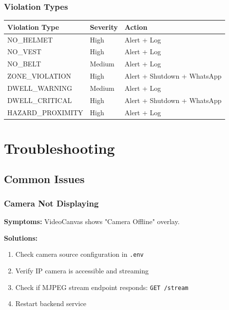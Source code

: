 \documentclass[12pt,a4paper,oneside]{book}
\begin{document}
\subsection{Violation Types}

\begin{tabular}{|l|l|l|}
    \hline
    \textbf{Violation Type} & \textbf{Severity} & \textbf{Action} \\
    \hline
    NO\_HELMET & High & Alert + Log \\
    \hline
    NO\_VEST & High & Alert + Log \\
    \hline
    NO\_BELT & Medium & Alert + Log \\
    \hline
    ZONE\_VIOLATION & High & Alert + Shutdown + WhatsApp \\
    \hline
    DWELL\_WARNING & Medium & Alert + Log \\
    \hline
    DWELL\_CRITICAL & High & Alert + Shutdown + WhatsApp \\
    \hline
    HAZARD\_PROXIMITY & High & Alert + Log \\
    \hline
\end{tabular}

\chapter{Troubleshooting}

\section{Common Issues}

\subsection{Camera Not Displaying}

\textbf{Symptoms:} VideoCanvas shows "Camera Offline" overlay.

\textbf{Solutions:}
\begin{enumerate}
    \item Check camera source configuration in \texttt{.env}
    \item Verify IP camera is accessible and streaming
    \item Check if MJPEG stream endpoint responds: \texttt{GET /stream}
    \item Restart backend service
\end{enumerate}
\end{document}
